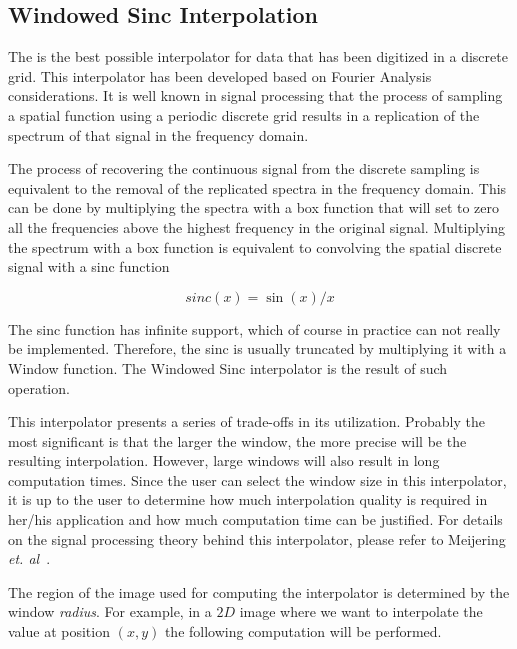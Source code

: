 \subsection{Windowed Sinc Interpolation}
\label{sec:WindowedSincInterpolation}

The  is the best possible
interpolator for data that has been digitized in a discrete grid. This
interpolator has been developed based on Fourier Analysis considerations. It
is well known in signal processing that the process of sampling a spatial
function using a periodic discrete grid results in a replication of the
spectrum of that signal in the frequency domain.

The process of recovering the continuous signal from the discrete sampling is
equivalent to the removal of the replicated spectra in the frequency domain.
This can be done by multiplying the spectra with a box function that will set
to zero all the frequencies above the highest frequency in the original signal.
Multiplying the spectrum with a box function is equivalent to convolving the
spatial discrete signal with a sinc function

\begin{equation}
sinc(x) = \sin{(x)} / x  
\end{equation}

The sinc function has infinite support, which of course in practice can not
really be implemented. Therefore, the sinc is usually truncated by multiplying
it with a Window function. The Windowed Sinc interpolator is the result of such
operation. 

This interpolator presents a series of trade-offs in its utilization. Probably
the most significant is that the larger the window, the more precise will be
the resulting interpolation. However, large windows will also result in long
computation times. Since the user can select the window size in this
interpolator, it is up to the user to determine how much interpolation quality
is required in her/his application and how much computation time can be
justified. For details on the signal processing theory behind this
interpolator, please refer to Meijering \emph{et.
al}~\cite{SignalReconstruction}.

The region of the image used for computing the interpolator is determined by
the window \emph{radius}. For example, in a $2D$ image where we want to
interpolate the value at position $(x,y)$ the following computation will be
performed.

